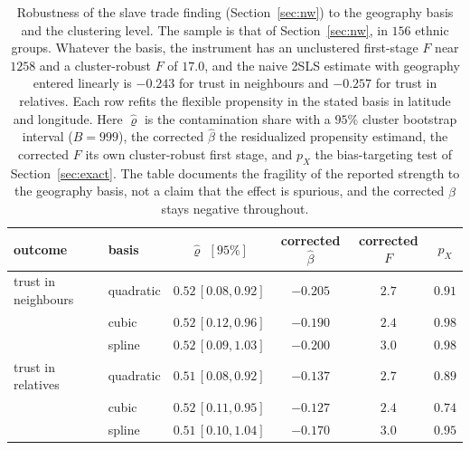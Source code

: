 \documentclass[preprint,11pt,authoryear]{elsarticle}
\theoremstyle{definition}
\begin{document}
\begin{table}[h]\centering
\caption{Robustness of the slave trade finding (Section~\ref{sec:nw}) to the geography
basis and the clustering level. The sample is that of Section~\ref{sec:nw}, in $156$
ethnic groups. Whatever the basis, the instrument has an unclustered first-stage $F$ near
$\num{1258}$ and a cluster-robust $F$ of $17.0$, and the naive 2SLS estimate with geography
entered linearly is $-0.243$ for trust in neighbours and $-0.257$ for trust in relatives.
Each row refits the flexible propensity in the stated basis in latitude and longitude. Here
$\hat\varrho$ is the contamination share with a $95\%$ cluster bootstrap interval
($B=999$), the corrected $\hat\beta$ the residualized propensity estimand, the corrected
$F$ its own cluster-robust first stage, and $p_X$ the bias-targeting test of
Section~\ref{sec:exact}. The table documents the fragility of the reported strength to the
geography basis, not a claim that the effect is spurious, and the corrected $\hat\beta$
stays negative throughout.}
\label{tab:nwrobust}
\begin{tabular}{llcccc}
\toprule
outcome & basis & $\hat\varrho$ $[95\%]$ & corrected $\hat\beta$ & corrected $F$ & $p_X$\\
\midrule
trust in neighbours & quadratic & $0.52\,[0.08,0.92]$ & $-0.205$ & $2.7$ & $0.91$\\
                    & cubic     & $0.52\,[0.12,0.96]$ & $-0.190$ & $2.4$ & $0.98$\\
                    & spline    & $0.52\,[0.09,1.03]$ & $-0.200$ & $3.0$ & $0.98$\\
\addlinespace
trust in relatives  & quadratic & $0.51\,[0.08,0.92]$ & $-0.137$ & $2.7$ & $0.89$\\
                    & cubic     & $0.52\,[0.11,0.95]$ & $-0.127$ & $2.4$ & $0.74$\\
                    & spline    & $0.51\,[0.10,1.04]$ & $-0.170$ & $3.0$ & $0.95$\\
\bottomrule
\end{tabular}
\end{table}
\end{document}
